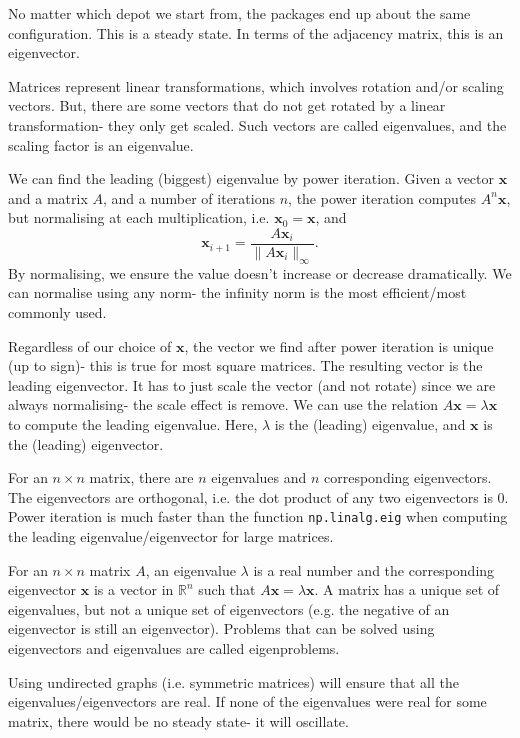 \documentclass[a4paper, openany]{memoir}
\begin{document}
    \noindent No matter which depot we start from, the packages end up about the same configuration. This is a steady state. In terms of the adjacency matrix, this is an eigenvector.

    Matrices represent linear transformations, which involves rotation and/or scaling vectors. But, there are some vectors that do not get rotated by a linear transformation- they only get scaled. Such vectors are called eigenvalues, and the scaling factor is an eigenvalue.

    We can find the leading (biggest) eigenvalue by power iteration. Given a vector $\mathbf{x}$ and a matrix $A$, and a number of iterations $n$, the power iteration computes $A^n \mathbf{x}$, but normalising at each multiplication, i.e. $\mathbf{x}_0 = \mathbf{x}$, and
    \[\mathbf{x}_{i+1} = \frac{A \mathbf{x}_i}{\lVert A \mathbf{x}_i \rVert_{\infty}}.\]
    By normalising, we ensure the value doesn't increase or decrease dramatically. We can normalise using any norm- the infinity norm is the most efficient/most commonly used.

    Regardless of our choice of $\mathbf{x}$, the vector we find after power iteration is unique (up to sign)- this is true for most square matrices. The resulting vector is the leading eigenvector. It has to just scale the vector (and not rotate) since we are always normalising- the scale effect is remove. We can use the relation $A \mathbf{x} = \lambda \mathbf{x}$ to compute the leading eigenvalue. Here, $\lambda$ is the (leading) eigenvalue, and $\mathbf{x}$ is the (leading) eigenvector.

    For an $n \times n$ matrix, there are $n$ eigenvalues and $n$ corresponding eigenvectors. The eigenvectors are orthogonal, i.e. the dot product of any two eigenvectors is 0. Power iteration is much faster than the function \texttt{np.linalg.eig} when computing the leading eigenvalue/eigenvector for large matrices.

    For an $n \times n$ matrix $A$, an eigenvalue $\lambda$ is a real number and the corresponding eigenvector $\mathbf{x}$ is a vector in $\mathbb{R}^n$ such that $A \mathbf{x} = \lambda \mathbf{x}$. A matrix has a unique set of eigenvalues, but not a unique set of eigenvectors (e.g. the negative of an eigenvector is still an eigenvector). Problems that can be solved using eigenvectors and eigenvalues are called eigenproblems.

    Using undirected graphs (i.e. symmetric matrices) will ensure that all the eigenvalues/eigenvectors are real. If none of the eigenvalues were real for some matrix, there would be no steady state- it will oscillate.
\end{document}
